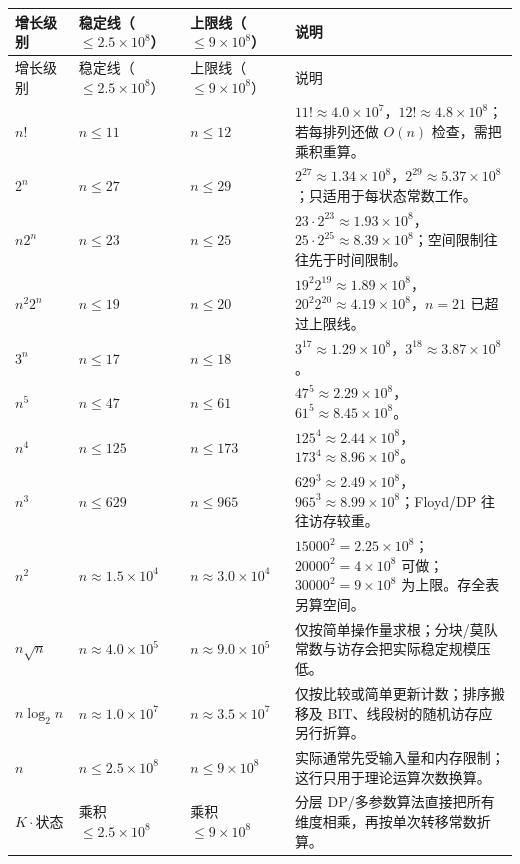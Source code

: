 \documentclass[a4paper,11pt]{article}
\begin{document}
\begingroup
\small
\begin{longtable}{L{2.8cm} L{3.8cm} L{3.8cm} L{5.9cm}}
\toprule
增长级别 & 稳定线（$\le2.5\times10^8$） & 上限线（$\le9\times10^8$） & 说明 \\
\midrule
\endfirsthead
\toprule
增长级别 & 稳定线（$\le2.5\times10^8$） & 上限线（$\le9\times10^8$） & 说明 \\
\midrule
\endhead
\endfoot
\bottomrule
\endlastfoot

$n!$ & $n\le11$ & $n\le12$ & $11!\approx4.0\times10^7$，$12!\approx4.8\times10^8$；若每排列还做 $O(n)$ 检查，需把乘积重算。\\
$2^n$ & $n\le27$ & $n\le29$ & $2^{27}\approx1.34\times10^8$，$2^{29}\approx5.37\times10^8$；只适用于每状态常数工作。\\
$n2^n$ & $n\le23$ & $n\le25$ & $23\cdot2^{23}\approx1.93\times10^8$，$25\cdot2^{25}\approx8.39\times10^8$；空间限制往往先于时间限制。\\
$n^2 2^n$ & $n\le19$ & $n\le20$ & $19^2 2^{19}\approx1.89\times10^8$，$20^2 2^{20}\approx4.19\times10^8$，$n=21$ 已超过上限线。\\
$3^n$ & $n\le17$ & $n\le18$ & $3^{17}\approx1.29\times10^8$，$3^{18}\approx3.87\times10^8$。\\
$n^5$ & $n\le47$ & $n\le61$ & $47^5\approx2.29\times10^8$，$61^5\approx8.45\times10^8$。\\
$n^4$ & $n\le125$ & $n\le173$ & $125^4\approx2.44\times10^8$，$173^4\approx8.96\times10^8$。\\
$n^3$ & $n\le629$ & $n\le965$ & $629^3\approx2.49\times10^8$，$965^3\approx8.99\times10^8$；Floyd/DP 往往访存较重。\\
$n^2$ & $n\approx1.5\times10^4$ & $n\approx3.0\times10^4$ & $15000^2=2.25\times10^8$；$20000^2=4\times10^8$ 可做；$30000^2=9\times10^8$ 为上限。存全表另算空间。\\
$n\sqrt n$ & $n\approx4.0\times10^5$ & $n\approx9.0\times10^5$ & 仅按简单操作量求根；分块/莫队常数与访存会把实际稳定规模压低。\\
$n\log_2 n$ & $n\approx1.0\times10^7$ & $n\approx3.5\times10^7$ & 仅按比较或简单更新计数；排序搬移及 BIT、线段树的随机访存应另行折算。\\
$n$ & $n\le2.5\times10^8$ & $n\le9\times10^8$ & 实际通常先受输入量和内存限制；这行只用于理论运算次数换算。\\
$K\cdot\text{状态}$ & 乘积 $\le2.5\times10^8$ & 乘积 $\le9\times10^8$ & 分层 DP/多参数算法直接把所有维度相乘，再按单次转移常数折算。\\
\bottomrule
\end{longtable}
\end{document}

